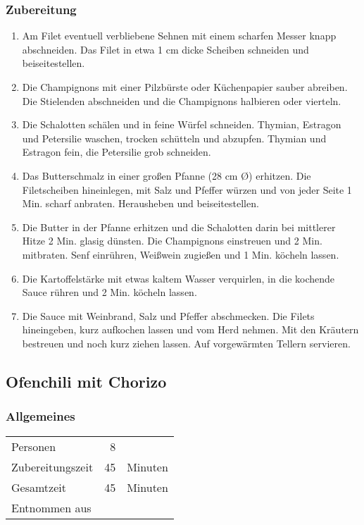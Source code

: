 \subsubsection*{Zubereitung}
\begin{enumerate}
	\item Am Filet eventuell verbliebene Sehnen mit einem scharfen Messer knapp abschneiden. Das Filet in etwa 1 cm dicke Scheiben schneiden und beiseitestellen.
	\item Die Champignons mit einer Pilzbürste oder Küchenpapier sauber abreiben. Die Stielenden abschneiden und die Champignons halbieren oder vierteln.
	\item Die Schalotten schälen und in feine Würfel schneiden. Thymian, Estragon und Petersilie waschen, trocken schütteln und abzupfen. Thymian und Estragon fein, die Petersilie grob schneiden.
	\item Das Butterschmalz in einer großen Pfanne (28 cm Ø) erhitzen. Die Filetscheiben hineinlegen, mit Salz und Pfeffer würzen und von jeder Seite 1 Min. scharf anbraten. Herausheben und beiseitestellen.
	\item Die Butter in der Pfanne erhitzen und die Schalotten darin bei mittlerer Hitze 2 Min. glasig dünsten. Die Champignons einstreuen und 2 Min. mitbraten. Senf einrühren, Weißwein zugießen und 1 Min. köcheln lassen.
	\item Die Kartoffelstärke mit etwas kaltem Wasser verquirlen, in die kochende Sauce rühren und 2 Min. köcheln lassen.
	\item Die Sauce mit Weinbrand, Salz und Pfeffer abschmecken. Die Filets hineingeben, kurz aufkochen lassen und vom Herd nehmen. Mit den Kräutern bestreuen und noch kurz ziehen lassen. Auf vorgewärmten Tellern servieren.
\end{enumerate}


\subsection{Ofenchili mit Chorizo}
\subsubsection*{Allgemeines}
\begin{tabular}{lrl}
	Personen         &  8 &  \\
	Zubereitungszeit & 45 & Minuten     \\
	Gesamtzeit       & 45 & Minuten     \\
	Entnommen aus    &    & \cite[vgl.][]{Oliver}
\end{tabular} 

